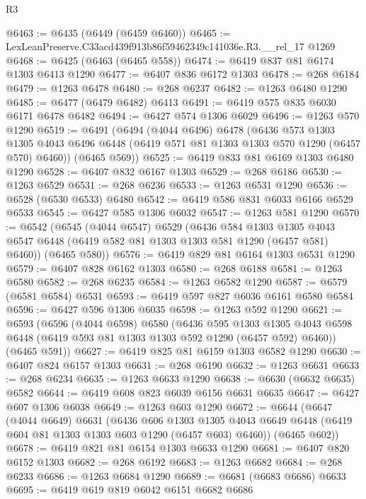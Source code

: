 \begin{lexlean}{R3}
\begin{coremodule}
@6463 := @6435 (@6449 (@6459 @6460))
@6465 := LexLeanPreserve.C33acd439f913b86f59462349c141036e.R3.__rel_17 @1269
@6468 := @6425 (@6463 (@6465 @558))
@6474 := @6419 @837 @81 @6174 @1303 @6413 @1290
@6477 := @6407 @836 @6172 @1303
@6478 := @268 @6184
@6479 := @1263 @6478
@6480 := @268 @6237
@6482 := @1263 @6480 @1290
@6485 := @6477 (@6479 @6482) @6413
@6491 := @6419 @575 @835 @6030 @6171 @6478 @6482
@6494 := @6427 @574 @1306 @6029
@6496 := @1263 @570 @1290
@6519 := @6491
    (@6494
      (@4044 @6496)
      @6478
      (@6436
        @573
        @1303
        @1305
        @4043
        @6496
        @6448
        (@6419 @571 @81 @1303 @1303 @570 @1290 (@6457 @570) @6460))
      (@6465 @569))
@6525 := @6419 @833 @81 @6169 @1303 @6480 @1290
@6528 := @6407 @832 @6167 @1303
@6529 := @268 @6186
@6530 := @1263 @6529
@6531 := @268 @6236
@6533 := @1263 @6531 @1290
@6536 := @6528 (@6530 @6533) @6480
@6542 := @6419 @586 @831 @6033 @6166 @6529 @6533
@6545 := @6427 @585 @1306 @6032
@6547 := @1263 @581 @1290
@6570 := @6542
    (@6545
      (@4044 @6547)
      @6529
      (@6436
        @584
        @1303
        @1305
        @4043
        @6547
        @6448
        (@6419 @582 @81 @1303 @1303 @581 @1290 (@6457 @581) @6460))
      (@6465 @580))
@6576 := @6419 @829 @81 @6164 @1303 @6531 @1290
@6579 := @6407 @828 @6162 @1303
@6580 := @268 @6188
@6581 := @1263 @6580
@6582 := @268 @6235
@6584 := @1263 @6582 @1290
@6587 := @6579 (@6581 @6584) @6531
@6593 := @6419 @597 @827 @6036 @6161 @6580 @6584
@6596 := @6427 @596 @1306 @6035
@6598 := @1263 @592 @1290
@6621 := @6593
    (@6596
      (@4044 @6598)
      @6580
      (@6436
        @595
        @1303
        @1305
        @4043
        @6598
        @6448
        (@6419 @593 @81 @1303 @1303 @592 @1290 (@6457 @592) @6460))
      (@6465 @591))
@6627 := @6419 @825 @81 @6159 @1303 @6582 @1290
@6630 := @6407 @824 @6157 @1303
@6631 := @268 @6190
@6632 := @1263 @6631
@6633 := @268 @6234
@6635 := @1263 @6633 @1290
@6638 := @6630 (@6632 @6635) @6582
@6644 := @6419 @608 @823 @6039 @6156 @6631 @6635
@6647 := @6427 @607 @1306 @6038
@6649 := @1263 @603 @1290
@6672 := @6644
    (@6647
      (@4044 @6649)
      @6631
      (@6436
        @606
        @1303
        @1305
        @4043
        @6649
        @6448
        (@6419 @604 @81 @1303 @1303 @603 @1290 (@6457 @603) @6460))
      (@6465 @602))
@6678 := @6419 @821 @81 @6154 @1303 @6633 @1290
@6681 := @6407 @820 @6152 @1303
@6682 := @268 @6192
@6683 := @1263 @6682
@6684 := @268 @6233
@6686 := @1263 @6684 @1290
@6689 := @6681 (@6683 @6686) @6633
@6695 := @6419 @619 @819 @6042 @6151 @6682 @6686

\end{coremodule}
\end{lexlean}
